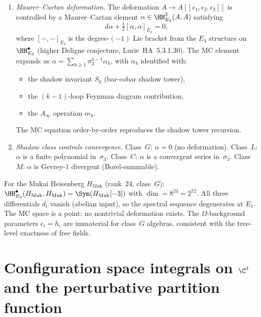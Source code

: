 \begin{conjecture}
\begin{enumerate}[label=\textup{(\alph*)}]
 \item \emph{Maurer--Cartan deformation.}
 The deformation $A \to A[[\epsilon_1, \epsilon_2, \epsilon_3]]$
 is controlled by a Maurer--Cartan element
 $\alpha \in \HH^2_{E_3}(A, A)$ satisfying
 \[
 d\alpha + \tfrac{1}{2}[\alpha, \alpha]_{E_3} = 0,
 \]
 where $[-,-]_{E_3}$ is the degree-$(-1)$ Lie bracket from the $E_4$
 structure on $\HH^\bullet_{E_3}$ \textup{(higher Deligne conjecture,
 Lurie~HA~5.3.1.30)}. The MC element expands as
 $\alpha = \sum_{k \ge 1} \sigma_3^{k-1} \alpha_k$,
 with $\alpha_k$ identified with:
 \begin{itemize}
 \item the shadow invariant $S_k$ \textup{(bar-cobar shadow tower)},
 \item the $(k{-}1)$-loop Feynman diagram contribution,
 \item the $A_\infty$ operation $m_k$.
 \end{itemize}
 The MC equation order-by-order reproduces the shadow tower recursion.

 \item \emph{Shadow class controls convergence.}
 Class~$G$: $\alpha = 0$ (no deformation).
 Class~$L$: $\alpha$ is a finite polynomial in~$\sigma_3$.
 Class~$C$: $\alpha$ is a convergent series in~$\sigma_3$.
 Class~$M$: $\alpha$ is Gevrey-$1$ divergent (Borel-summable).
\end{enumerate}
\end{conjecture}

\begin{remark}
\label{rem:mukai-heisenberg-e3-trivial-deformation}
For the Mukai Heisenberg $H_{\mathrm{Muk}}$ (rank~$24$, class~$G$):
$\HH^\bullet_{E_3}(H_{\mathrm{Muk}}, H_{\mathrm{Muk}})
= \Sym(H_{\mathrm{Muk}}[-3])$
with $\dim = 8^{24} = 2^{72}$. All three differentials $d_i$ vanish
(abelian input), so the spectral sequence degenerates at $E_1$. The
MC space is a point: no nontrivial deformation exists. The
$\Omega$-background parameters $\epsilon_i = h_i$ are immaterial for
class~$G$ algebras, consistent with the tree-level exactness of free
fields.
\end{remark}

\section{Configuration space integrals on \texorpdfstring{$\C^3$}{C-3} and the perturbative partition function}
\label{sec:config-space-c3}

